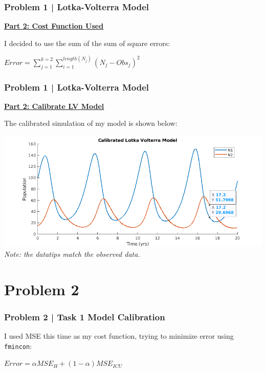 \documentclass[aspectratio=1610]{beamer}
\begin{document}
\begin{frame}
\frametitle{Problem 1 | Lotka-Volterra Model}
\textbf{\underline{Part 2: Cost Function Used}}\

I decided to use the sum of the sum of square errors:
\vspace{1em}

\centering
$Error = \sum_{j = 1}^{k = 2}\sum_{i = 1}^{length(N_j)}(N_j-Obs_j)^2$

\end{frame}

\begin{frame}
\frametitle{Problem 1 | Lotka-Volterra Model}
\textbf{\underline{Part 2: Calibrate LV Model}}
\vspace{1em}

The calibrated simulation of my model is shown below:
\vspace{.5em}

\centering
\includegraphics[width = .9\textwidth]{LV_calib} \\
\textit{Note: the datatips match the observed data.}

\end{frame}

\section{Problem 2}
\begin{frame}[fragile]
\frametitle{Problem 2 | Task 1 Model Calibration}

I used MSE this time as my cost function, trying to minimize error using \verb|fmincon|:
\vspace{1em}

\centering
$Error = \alpha MSE_H + (1-\alpha) MSE_{ICU}$
\end{frame}
\end{document}
